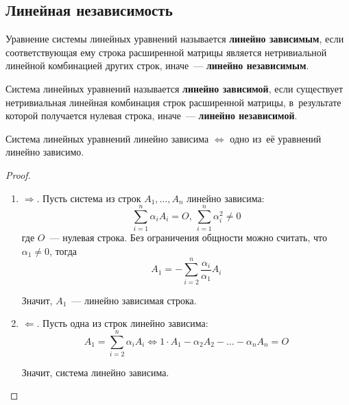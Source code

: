 \subsection{Линейная независимость}
Уравнение системы линейных уравнений называется \textbf{линейно зависимым}, если соответствующая ему строка расширенной матрицы является нетривиальной линейной комбинацией других строк, иначе~--- \textbf{линейно независимым}.

Система линейных уравнений называется \textbf{линейно зависимой}, если существует нетривиальная линейная комбинация строк расширенной матрицы, в~результате которой получается нулевая строка, иначе~--- \textbf{линейно независимой}.

\begin{statement}
Система линейных уравнений линейно зависима $\Leftrightarrow$ одно из~её уравнений линейно зависимо.
\end{statement}
\begin{proof}
\begin{enumerate}
	\item $\Rightarrow$. Пусть система из строк $A_1, \ldots, A_n$ линейно зависима:
	\begin{equation*}
	\sum_{i=1}^n \alpha_i A_i = O, \ \sum_{i=1}^n \alpha_i^2 \neq 0
	\end{equation*}
	где $O$~--- нулевая строка. Без ограничения общности можно считать, что $\alpha_1 \neq 0$, тогда
	\begin{equation*}
	A_1 = -\sum_{i=2}^n \frac{\alpha_i}{\alpha_1} A_i
	\end{equation*}
	
	Значит, $A_1$~--- линейно зависимая строка.
	
	\item $\Leftarrow$. Пусть одна из строк линейно зависима:
	\begin{equation*}
	A_1 = \sum_{i=2}^n \alpha_i A_i \Leftrightarrow
	1 \cdot A_1 - \alpha_2 A_2 - \ldots - \alpha_n A_n = O
	\end{equation*}
	
	Значит, система линейно зависима.
\end{enumerate}
\end{proof}